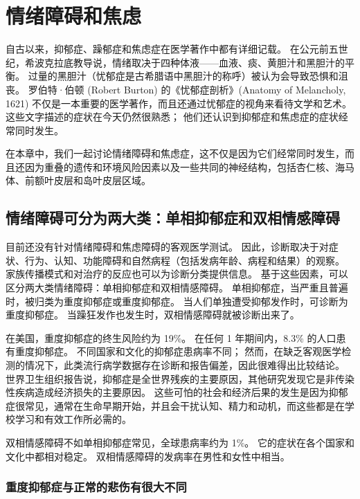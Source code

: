 \chapter{情绪障碍和焦虑} \label{chap:chap61}

自古以来，抑郁症、躁郁症和焦虑症在医学著作中都有详细记载。
在公元前五世纪，希波克拉底教导说，情绪取决于四种体液——血液、痰、黄胆汁和黑胆汁的平衡。
过量的黑胆汁（忧郁症是古希腊语中黑胆汁的称呼）被认为会导致恐惧和沮丧。
罗伯特·伯顿 (Robert Burton) 的《忧郁症剖析》(Anatomy of Melancholy, 1621) 不仅是一本重要的医学著作，而且还通过忧郁症的视角来看待文学和艺术。
这些文字描述的症状在今天仍然很熟悉；
他们还认识到抑郁症和焦虑症的症状经常同时发生。


在本章中，我们一起讨论情绪障碍和焦虑症，这不仅是因为它们经常同时发生，而且还因为重叠的遗传和环境风险因素以及一些共同的神经结构，包括杏仁核、海马体、前额叶皮层和岛叶皮层区域。



\section{情绪障碍可分为两大类：单相抑郁症和双相情感障碍}

目前还没有针对情绪障碍和焦虑障碍的客观医学测试。
因此，诊断取决于对症状、行为、认知、功能障碍和自然病程（包括发病年龄、病程和结果）的观察。
家族传播模式和对治疗的反应也可以为诊断分类提供信息。
基于这些因素，可以区分两大类情绪障碍：单相抑郁症和双相情感障碍。
单相抑郁症，当严重且普遍时，被归类为重度抑郁症或重度抑郁症。
当人们单独遭受抑郁发作时，可诊断为重度抑郁症。
当躁狂发作也发生时，双相情感障碍就被诊断出来了。


在美国，重度抑郁症的终生风险约为 19\%。
在任何 1 年期间内，8.3\% 的人口患有重度抑郁症。
不同国家和文化的抑郁症患病率不同；
然而，在缺乏客观医学检测的情况下，此类流行病学数据存在诊断和报告偏差，因此很难得出比较结论。
世界卫生组织报告说，抑郁症是全世界残疾的主要原因，其他研究发现它是非传染性疾病造成经济损失的主要原因。
这些可怕的社会和经济后果的发生是因为抑郁症很常见，通常在生命早期开始，并且会干扰认知、精力和动机，而这些都是在学校学习和有效工作所必需的。


双相情感障碍不如单相抑郁症常见，全球患病率约为 1\%。
它的症状在各个国家和文化中都相对稳定。
双相情感障碍的发病率在男性和女性中相当。



\subsection{重度抑郁症与正常的悲伤有很大不同}


